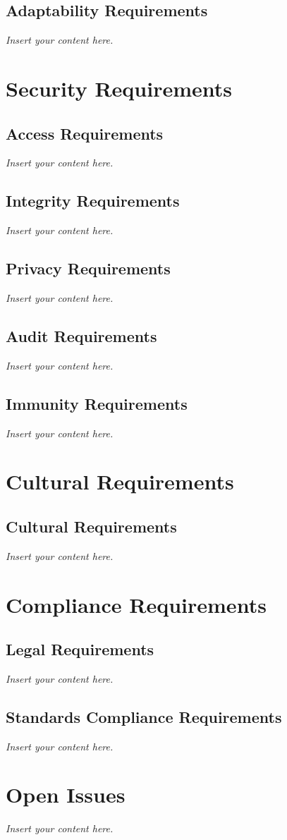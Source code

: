 \documentclass[12pt]{article}
\newcommand{\lips}{\textit{Insert your content here.}}
\begin{document}
\subsection{Adaptability Requirements}
\lips

\section{Security Requirements}
\subsection{Access Requirements}
\lips
\subsection{Integrity Requirements}
\lips
\subsection{Privacy Requirements}
\lips
\subsection{Audit Requirements}
\lips
\subsection{Immunity Requirements}
\lips

\section{Cultural Requirements}
\subsection{Cultural Requirements}
\lips

\section{Compliance Requirements}
\subsection{Legal Requirements}
\lips
\subsection{Standards Compliance Requirements}
\lips

\section{Open Issues}
\lips
\end{document}
